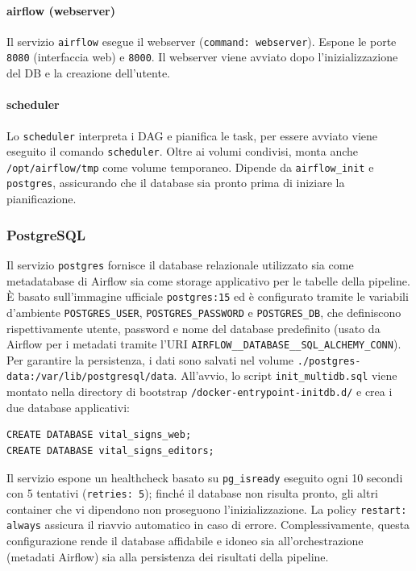 \paragraph{airflow (webserver)}
Il servizio \texttt{airflow} esegue il webserver (\texttt{command: webserver}).
Espone le porte \texttt{8080} (interfaccia web) e \texttt{8000}. Il webserver viene avviato dopo l’inizializzazione del DB e la creazione dell’utente.

\paragraph{scheduler}
Lo \texttt{scheduler} interpreta i DAG e pianifica le task, per essere avviato viene eseguito il comando \texttt{scheduler}.
Oltre ai volumi condivisi, monta anche \texttt{/opt/airflow/tmp} come volume temporaneo.  
Dipende da \texttt{airflow\_init} e \texttt{postgres}, assicurando che il database sia pronto prima di iniziare la pianificazione.

\subsubsection{PostgreSQL}
Il servizio \texttt{postgres} fornisce il database relazionale utilizzato sia come metadatabase di Airflow sia come storage applicativo per le tabelle della pipeline. È basato sull’immagine ufficiale \texttt{postgres:15} ed è configurato tramite le variabili d’ambiente \texttt{POSTGRES\_USER}, \texttt{POSTGRES\_PASSWORD} e \texttt{POSTGRES\_DB}, che definiscono rispettivamente utente, password e nome del database predefinito (usato da Airflow per i metadati tramite l’URI \texttt{AIRFLOW\_\_DATABASE\_\_SQL\_ALCHEMY\_CONN}).\\
Per garantire la persistenza, i dati sono salvati nel volume \texttt{./postgres-data:/var/lib/postgresql/data}. All'avvio, lo script \texttt{init\_multidb.sql} viene montato nella directory di bootstrap \texttt{/docker-entrypoint-initdb.d/} e crea i due database applicativi:
\begin{verbatim}
CREATE DATABASE vital_signs_web;
CREATE DATABASE vital_signs_editors;
\end{verbatim}

Il servizio espone un healthcheck basato su \texttt{pg\_isready} eseguito ogni 10 secondi con 5 tentativi (\texttt{retries: 5}); finché il database non risulta pronto, gli altri container che vi dipendono non proseguono l’inizializzazione. La policy \texttt{restart: always} assicura il riavvio automatico in caso di errore. Complessivamente, questa configurazione rende il database affidabile e idoneo sia all’orchestrazione (metadati Airflow) sia alla persistenza dei risultati della pipeline.

